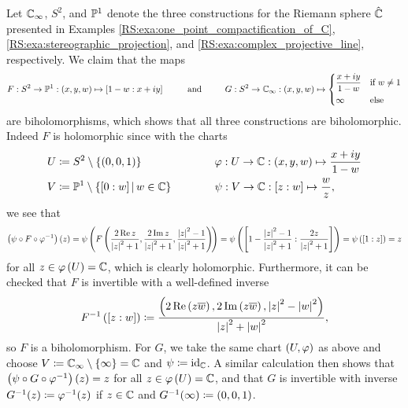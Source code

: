 \documentclass[../Moduli_Spaces_of_Riemann_Surfaces.tex]{subfiles}
\begin{document}
    \begin{example}\label{RS:exa:biholomorphisms_between_Riemann_spheres}
        Let $\C_\infty$, $S^2$, and $\P^1$ denote the three constructions for the Riemann sphere $\RS$ presented in Examples \ref{RS:exa:one_point_compactification_of_C}, \ref{RS:exa:stereographic_projection}, and \ref{RS:exa:complex_projective_line}, respectively. We claim that the maps
        \begin{equation*}
            F:S^2\to\P^1:\tpl{x,y,w}\mapsto\proje{1-w:x+iy}\ \ \ \ \ \ \ \ \textrm{and}\ \ \ \ \ \ \ \ G:S^2\to\C_\infty:\tpl{x,y,w}\mapsto
            \begin{dcases}
                \frac{x+iy}{1-w} & \textrm{if }w\neq1 \\
                \infty & \textrm{else}
            \end{dcases}
        \end{equation*}
        are biholomorphisms, which shows that all three constructions are biholomorphic. Indeed $F$ is holomorphic since with the charts
        \begin{equation*}
            \begin{alignedat}{2}
                U&\coloneqq S^2\comp\l\{\l(0,0,1\r)\r\}\ \ \ \ \ \ \ \ \ \ \ \ \ \ \ \ \ \ \ \ &&\phi:U\to\C:\tpl{x,y,w}\mapsto\frac{x+iy}{1-w} \\
                V&\coloneqq\P^1\comp\l\{\proje{0:w}\mid w\in\C\r\}&&\psi:V\to\C:\proje{z:w}\mapsto\frac{w}{z},
            \end{alignedat}
        \end{equation*}
        we see that
        \begin{equation*}
            \l(\psi\circ F\circ\phi^{-1}\r)\l(z\r)=\psi\l(F\l(\frac{2\Re z}{\l|z\r|^2+1},\frac{2\Im z}{\l|z\r|^2+1},\frac{\l|z\r|^2-1}{\l|z\r|^2+1}\r)\!\r)=\psi\l(\proje{1-\frac{\l|z\r|^2-1}{\l|z\r|^2+1}:\frac{2z}{\l|z\r|^2+1}}\r)=\psi\l(\proje{1:z}\r)=z
        \end{equation*}
        for all $z\in\phi\l(U\r)=\C$, which is clearly holomorphic. Furthermore, it can be checked that $F$ is invertible with a well-defined inverse
        \begin{equation*}
            F^{-1}\l(\proje{z:w}\r)\coloneqq\frac{\tpl{2\Re\l(z\bar{w}\r),2\Im\l(z\bar{w}\r),\l|z\r|^2-\l|w\r|^2}}{\l|z\r|^2+\l|w\r|^2},
        \end{equation*}
        so $F$ is a biholomorphism. For $G$, we take the same chart $\tpl{U,\phi}$ as above and choose $V\coloneqq\C_\infty\comp\l\{\infty\r\}=\C$ and $\psi\coloneqq\id_\C$. A similar calculation then shows that $\l(\psi\circ G\circ\phi^{-1}\r)\l(z\r)=z$ for all $z\in\phi\l(U\r)=\C$, and that $G$ is invertible with inverse $G^{-1}\!\l(z\r)\coloneqq\phi^{-1}\!\l(z\r)$ if $z\in\C$ and $G^{-1}\!\l(\infty\r)\coloneqq\tpl{0,0,1}$.\exqed
    \end{example}
\end{document}
